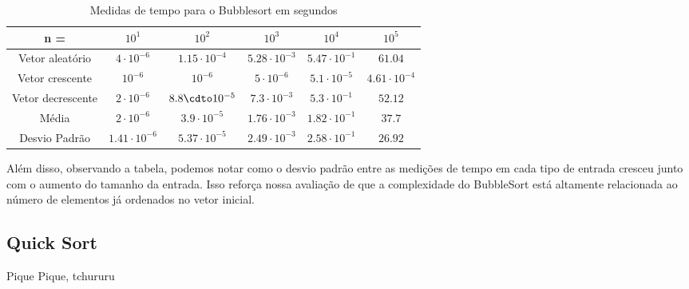 \documentclass{article}
\begin{document}
\begin{table}[h]
    \begin{tabular}{c|c|c|c|c|c}
        n = & $10^{1}$ & $10^{2}$ & $10^{3}$ & $10^{4}$ & $10^{5}$ \\ 
        \hline
        Vetor aleatório & $4\cdot 10^{-6}$ & $1.15\cdot 10^{-4}$ & $5.28\cdot 10^{-3}$ & $5.47\cdot 10^{-1}$ & $61.04$ \\
        \hline
        Vetor crescente & $10^{-6}$ & $10^{-6}$ & $5\cdot 10^{-6}$ & $5.1\cdot 10^{-5}$ & $4.61\cdot 10^{-4}$\\
        \hline
        Vetor decrescente & $2\cdot10^{-6}$ & $8.8\cdto10^{-5}$ & $7.3\cdot 10^{-3}$ & $5.3\cdot 10^{-1}$ & $52.12$\\
        \hline
        Média & $2\cdot 10^{-6}$ & $3.9\cdot 10^{-5}$ & $1.76\cdot 10^{-3}$ & $1.82\cdot 10^{-1}$ & $37.7$ \\
        \hline
        Desvio Padrão & $1.41\cdot 10^{-6}$ & $5.37\cdot 10^{-5}$ & $2.49\cdot 10^{-3}$ & $2.58\cdot 10^{-1}$ & $26.92$ \\
    \end{tabular}
    \caption{Medidas de tempo para o Bubblesort em segundos}
\end{table}\par
Além disso, observando a tabela, podemos notar como o desvio padrão entre as medições de tempo em cada tipo de entrada cresceu junto com o aumento do tamanho da entrada. Isso reforça nossa avaliação de que a complexidade do BubbleSort está altamente relacionada ao número de elementos já ordenados no vetor inicial.
\subsection{Quick Sort}
Pique Pique, tchururu
\end{document}
